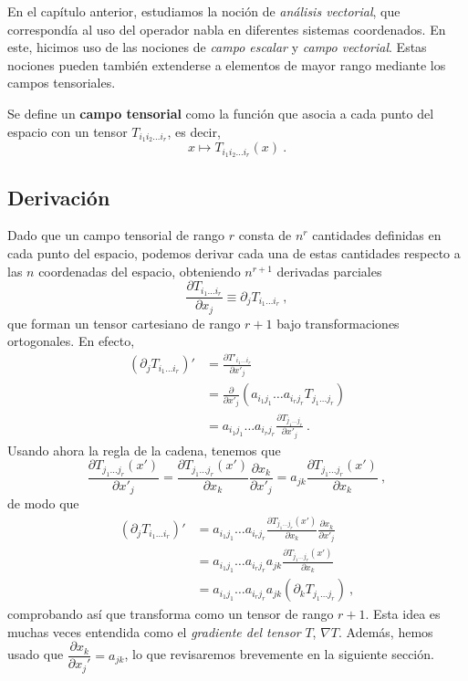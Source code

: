 En el capítulo anterior, estudiamos la noción de \emph{análisis vectorial}, que correspondía al uso del operador nabla en diferentes sistemas coordenados. En este, hicimos uso de las nociones de \emph{campo escalar} y \emph{campo vectorial}. Estas nociones pueden también extenderse a elementos de mayor rango mediante los campos tensoriales.
\begin{defi} 
    Se define un \textbf{campo tensorial} como la función que asocia a cada punto del espacio con un tensor $T_{i_1 i_2 \dots i_r}$, es decir,
    \begin{equation}
        x \mapsto T_{i_1 i_2 \dots i_r}(x) \ .
    \end{equation}
\end{defi}

\subsection{Derivación}

Dado que un campo tensorial de rango $r$ consta de $n^r$ cantidades definidas en cada punto del espacio, podemos derivar cada una de estas cantidades respecto a las $n$ coordenadas del espacio, obteniendo $n^{r+1}$ derivadas parciales
\begin{equation}
    \frac{\partial T_{i_1 \dots i_r}}{\partial x_j} \equiv \partial_j T_{i_1 \dots i_r} \ ,
\end{equation}
que forman un tensor cartesiano de rango $r+1$ bajo transformaciones ortogonales. En efecto,
\begin{align}
    (\partial_j T_{i_1 \dots i_r})' & = \frac{\partial T'_{i_1 \dots i_r}}{\partial x'_j} \\
    & = \frac{\partial}{\partial x'_j}(a_{i_1 j_1} \dots a_{i_r j_r} T_{j_1 \dots j_r}) \\
    & = a_{i_1 j_1} \dots a_{i_r j_r} \frac{\partial T_{j_1 \dots j_r}}{\partial x'_j} \ .
\end{align}
Usando ahora la regla de la cadena, tenemos que
\begin{equation}
    \frac{\partial T_{j_1 \dots j_r}(x')}{\partial x'_j} = \frac{\partial T_{j_1 \dots j_r}(x')}{\partial x_k} \frac{\partial x_k}{\partial x'_j} = a_{jk} \frac{\partial T_{j_1 \dots j_r}(x')}{\partial x_k}\ ,
\end{equation}
de modo que
\begin{align}
    (\partial_j T_{i_1 \dots i_r})' & = a_{i_1 j_1} \dots a_{i_r j_r} \frac{\partial T_{j_1 \dots j_r}(x')}{\partial x_k} \frac{\partial x_k}{\partial x'_j} \\
    & = a_{i_1 j_1} \dots a_{i_r j_r}  a_{jk} \frac{\partial T_{j_1 \dots j_r}(x')}{\partial x_k} \\
    & = a_{i_1 j_1} \dots a_{i_r j_r}  a_{jk} (\partial_k T_{j_1 \dots j_r}) \ ,
\end{align}
comprobando así que transforma como un tensor de rango $r+1$. Esta idea es muchas veces entendida como el \emph{gradiente del tensor} $T$, $\nabla T$. Además, hemos usado que $\dfrac{\partial x_k}{\partial x_j'} = a_{jk}$, lo que revisaremos brevemente en la siguiente sección.

